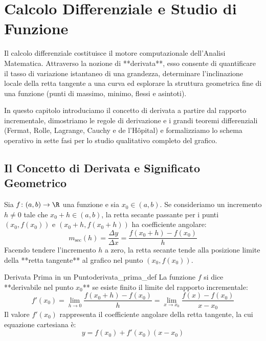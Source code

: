 \chapter{Calcolo Differenziale e Studio di Funzione}
\label{chap:calcolo_differenziale}

Il calcolo differenziale costituisce il motore computazionale dell'Analisi Matematica. Attraverso la nozione di **derivata**, esso consente di quantificare il tasso di variazione istantaneo di una grandezza, determinare l'inclinazione locale della retta tangente a una curva ed esplorare la struttura geometrica fine di una funzione (punti di massimo, minimo, flessi e asintoti).

In questo capitolo introduciamo il concetto di derivata a partire dal rapporto incrementale, dimostriamo le regole di derivazione e i grandi teoremi differenziali (Fermat, Rolle, Lagrange, Cauchy e de l'Hôpital) e formalizziamo lo schema operativo in sette fasi per lo studio qualitativo completo del grafico.

\section{Il Concetto di Derivata e Significato Geometrico}
\label{sec:derivata_definizione_dettagliata}

Sia $f \colon (a, b) \to \R$ una funzione e sia $x_0 \in (a, b)$. Se consideriamo un incremento $h \neq 0$ tale che $x_0 + h \in (a, b)$, la retta secante passante per i punti $(x_0, f(x_0))$ e $(x_0 + h, f(x_0 + h))$ ha coefficiente angolare:
\[
    m_{\text{sec}}(h) = \frac{\Delta y}{\Delta x} = \frac{f(x_0 + h) - f(x_0)}{h}
\]
Facendo tendere l'incremento $h$ a zero, la retta secante tende alla posizione limite della **retta tangente** al grafico nel punto $(x_0, f(x_0))$.

\begin{definizione}{Derivata Prima in un Punto}{derivata_prima_def}
La funzione $f$ si dice **derivabile nel punto $x_0$** se esiste finito il limite del rapporto incrementale:
\[
    f'(x_0) = \lim_{h \to 0} \frac{f(x_0 + h) - f(x_0)}{h} = \lim_{x \to x_0} \frac{f(x) - f(x_0)}{x - x_0}
\]
Il valore $f'(x_0)$ rappresenta il coefficiente angolare della retta tangente, la cui equazione cartesiana è:
\[
    y = f(x_0) + f'(x_0)(x - x_0)
\]
\end{definizione}


